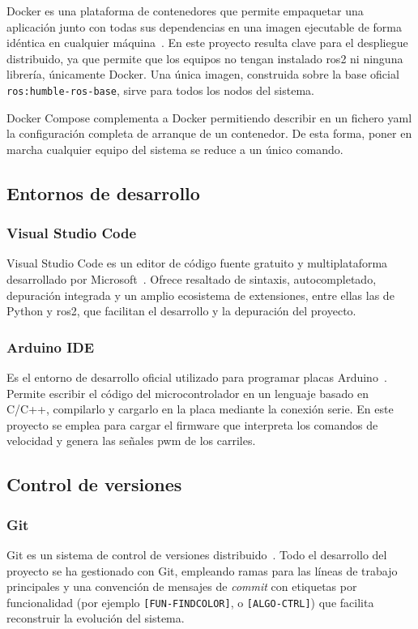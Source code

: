 Docker es una plataforma de contenedores que permite empaquetar una aplicación junto con todas sus dependencias en una imagen ejecutable de forma idéntica en cualquier máquina~\cite{docker}. En este proyecto resulta clave para el despliegue distribuido, ya que permite que los equipos no tengan instalado \gls{ros2} ni ninguna librería, únicamente Docker. Una única imagen, construida sobre la base oficial \texttt{ros:humble-ros-base}, sirve para todos los nodos del sistema.

Docker Compose complementa a Docker permitiendo describir en un fichero \gls{yaml} la configuración completa de arranque de un contenedor. De esta forma, poner en marcha cualquier equipo del sistema se reduce a un único comando.

\subsection{Entornos de desarrollo}

\subsubsection{Visual Studio Code}

Visual Studio Code es un editor de código fuente gratuito y multiplataforma desarrollado por Microsoft~\cite{vscode}. Ofrece resaltado de sintaxis, autocompletado, depuración integrada y un amplio ecosistema de extensiones, entre ellas las de Python y \gls{ros2}, que facilitan el desarrollo y la depuración del proyecto.

\subsubsection{Arduino IDE}

Es el entorno de desarrollo oficial utilizado para programar placas Arduino~\cite{arduinoide}. Permite escribir el código del microcontrolador en un lenguaje basado en C/C++, compilarlo y cargarlo en la placa mediante la conexión serie. En este proyecto se emplea para cargar el firmware que interpreta los comandos de velocidad y genera las señales \gls{pwm} de los carriles.

\subsection{Control de versiones}
\subsubsection{Git}
Git es un sistema de control de versiones distribuido~\cite{git}. Todo el desarrollo del proyecto se ha gestionado con Git, empleando ramas para las líneas de trabajo principales y una convención de mensajes de \textit{commit} con etiquetas por funcionalidad (por ejemplo \texttt{[FUN-\allowbreak FINDCOLOR]}, o \texttt{[ALGO-CTRL]}) que facilita reconstruir la evolución del sistema.

